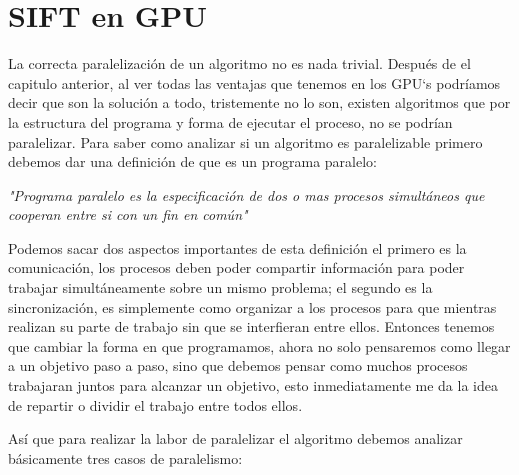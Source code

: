 
\chapter{ SIFT en GPU}

La correcta paralelización de un algoritmo no es nada trivial. Después de el capitulo anterior, al ver todas las ventajas que tenemos en los GPU`s podríamos decir que son la solución a todo, tristemente no lo son, existen algoritmos que por la estructura del programa y forma de ejecutar el proceso, no se podrían paralelizar. Para saber como analizar si un algoritmo es paralelizable primero debemos dar una definición de que es un programa paralelo:

\begin{center}
\textit{"Programa paralelo es la especificación de dos o mas procesos simultáneos que cooperan entre si con un fin en común"}
\end{center}

Podemos sacar dos aspectos importantes de esta definición el primero es la comunicación, los procesos deben poder compartir información  para poder trabajar simultáneamente sobre un mismo problema; el segundo es la sincronización, es simplemente como organizar a los procesos para que mientras realizan su parte de trabajo sin que se interfieran entre ellos.
Entonces tenemos que cambiar la forma en que programamos, ahora no solo pensaremos como llegar a un objetivo paso a paso, sino  que debemos pensar como muchos procesos trabajaran juntos para alcanzar un objetivo, esto inmediatamente me da la idea de repartir o dividir el trabajo entre todos ellos. 

\pagebreak

Así que para realizar la labor de paralelizar el algoritmo debemos analizar básicamente tres casos de paralelismo:
 
